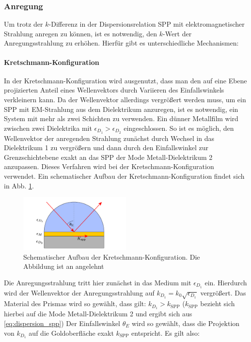\documentclass[titlepage]{article}
\begin{document}
	\subsubsection{Anregung}
	Um trotz der $k$-Differenz in der Dispersionsrelation SPP mit elektromagnetischer Strahlung anregen zu können, ist es notwendig, den $k$-Wert der Anregungsstrahlung zu erhöhen. Hierfür gibt es unterschiedliche Mechanismen:
	\paragraph{Kretschmann-Konfiguration}
	In der Kretschmann-Konfiguration wird ausgenutzt, dass man den auf eine Ebene projizierten Anteil eines Wellenvektors durch Variieren des Einfallswinkels verkleinern kann. Da der Wellenvektor allerdings vergrößert werden muss, um ein SPP mit EM-Strahlung aus dem Dielektrikum anzuregen, ist es notwendig, ein System mit mehr als zwei Schichten zu verwenden. Ein dünner Metallfilm wird zwischen zwei Dielektrika mit $\epsilon_{D_1} > \epsilon_{D_2}$ eingeschlossen. So ist es möglich, den Wellenvektor der anregenden Strahlung zunächst durch Wechsel in das Dielektrikum 1 zu vergrößern und dann durch den Einfallswinkel zur Grenzschichtebene exakt an das SPP der Mode Metall-Dielektrikum 2 anzupassen. Dieses Verfahren wird bei der Kretschmann-Konfiguration verwendet. Ein schematischer Aufbau der Kretschmann-Konfiguration findet sich in Abb. \ref{fig:kretschman}.
	\begin{figure}[h] 
		\centering
		\includegraphics[width=0.5\textwidth]{figures/Kretschmann.pdf}
		\caption{Schematischer Aufbau der Kretschmann-Konfiguration. Die Abbildung ist an \cite{Jaruschewski.2020} angelehnt}
		\label{fig:kretschman}
	\end{figure}
	Die Anregungsstrahlung tritt hier zunächst in das Medium mit $\epsilon_{D_1}$ ein. Hierdurch wird der Wellenvektor der Anregungsstrahlung auf $k_{D_1}=k_0\sqrt{\epsilon_{D_1}}$ vergrößert. Das Material des Prismas wird so gewählt, dass gilt:  $k_{D_1}> k_{\mathrm{SPP}}$ ($k_{\mathrm{SPP}}$ bezieht sich hierbei auf die Mode Metall-Dielektrikum 2 und ergibt sich aus \eqref{eq:dispersion_spp}) Der Einfallswinkel $\theta_E$ wird so gewählt, dass die Projektion von $k_{D_1}$ auf die Goldoberfläche exakt $k_{\mathrm{SPP}}$ entspricht. Es gilt also:
\end{document}
